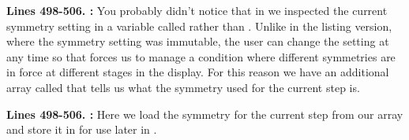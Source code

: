 \textbf{Lines 498-506. :} You probably didn't notice that in 
we inspected the current symmetry setting in a variable called  rather than .
Unlike in the listing version, where the symmetry setting was immutable, the user can change the setting at any time so that forces us to
manage a condition where different symmetries are in force at different stages in the display. For this reason we have an additional array
called  that tells us what the symmetry used for the current step is.  

\textbf{Lines 498-506. :} Here we load the symmetry for the current step from our array and store it in
 for use later in .

